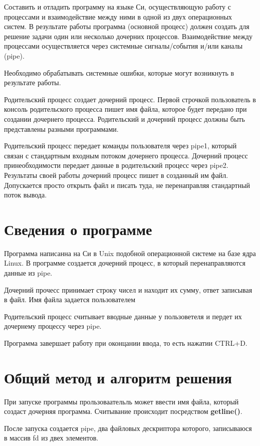 \documentclass[pdf, unicode, 12pt, a4paper,oneside,fleqn]{article}
\begin{document}
Составить и отладить программу на языке Си, осуществляющую работу с процессами и
взаимодействие между ними в одной из двух операционных систем. В результате работы
программа (основной процесс) должен создать для решение задачи один или несколько
дочерних процессов. Взаимодействие между процессами осуществляется через системные
сигналы/события и/или каналы (pipe).

Необходимо обрабатывать системные ошибки, которые могут возникнуть в результате работы.

Родительский процесс создает дочерний процесс. Первой строчкой пользователь в консоль
родительского процесса пишет имя файла, которое будет передано при создании дочернего
процесса. Родительский и дочерний процесс должны быть представлены разными программами.

Родительский процесс передает команды пользователя через pipe1, который связан с
стандартным входным потоком дочернего процесса. Дочерний процесс принеобходимости
передает данные в родительский процесс через pipe2. Результаты своей работы дочерний
процесс пишет в созданный им файл. Допускается просто открыть файл и писать туда, не
перенаправляя стандартный поток вывода.

\section{Сведения о программе}

Программа написанна на Си в Unix подобной операционной системе на базе ядра Linux.
В программе создается дочерний процесс, в который перенаправляются данные из pipe.

Дочерний прочесс принимает строку чисел и находит их сумму, ответ записывая в файл. Имя файла задается пользователем

Родительский процесс считывает вводные данные у пользоветеля и пердет их дочернему процессу через pipe.

Программа завершает работу при оконцании ввода, то есть нажатии CTRL+D.

\section{Общий метод и алгоритм решения}

При запуске программы прользоваательль может ввести имя файла, который создаст дочерняя программа.
Считывание происходит посредством \textbf{getline()}.

После запуска создается pipe, два файловых дескриптора которого, записываюся в массив fd из двех элементов.
\end{document}
